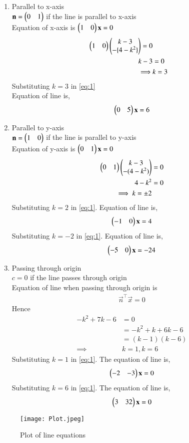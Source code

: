 \documentclass[journal,12pt,twocolumn]{IEEEtran}
\begin{document}
\begin{enumerate}[label=\emph{\alph*)}]
\item Parallel to x-axis\\
$\mathbf{n}=\begin{pmatrix}0 & 1\end{pmatrix}$ if the line is parallel to x-axis\\
Equation of x-axis is $\begin{pmatrix}1 & 0\end{pmatrix}\mathbf{x}=0$\
\begin{equation}
\begin{split}
  \begin{pmatrix}1 & 0\end{pmatrix}\begin{pmatrix}k-3\\-\{4-k^2\}\end{pmatrix} = 0 \label{eq1}\\
  k-3&= 0\\
\implies &k=3
\end{split}
\end{equation}
Substituting $k=3$ in \eqref{eq:1}\\
Equation of line is,
\begin{align}
     \begin{pmatrix}0 & 5\end{pmatrix}\mathbf{x}=6
\end{align}
 
\item Parallel to y-axis\\
$\mathbf{n}=\begin{pmatrix}1 & 0\end{pmatrix}$ if the line is parallel to y-axis\\
Equation of y-axis is $\begin{pmatrix}0 & 1\end{pmatrix}\mathbf{x}=0$
\begin{equation} \label{eq1}
\begin{split}
\begin{pmatrix}0 & 1\end{pmatrix}\begin{pmatrix}k-3\\-(4-k^2)\end{pmatrix} &= 0\\
 4-k^2 & =0\\
 \implies k=\pm2
\end{split}
\end{equation}
Substituting $k=2$ in \eqref{eq:1}.
Equation of line is,
\begin{align}
     \begin{pmatrix}-1 & 0\end{pmatrix}\mathbf{x}= 4
\end{align}
Substituting $k=-2$ in \eqref{eq:1}.
Equation of line is,
\begin{align}
  \begin{pmatrix}-5 & 0\end{pmatrix}\mathbf{x}=-24
\end{align}
\item Passing through origin\\
${c = 0}$ \hspace{4mm}if the line passes through origin\\
Equation of line when passing through origin is 
\begin{align}
\vec{n}^\top\vec{x}=0
\end{align}
Hence
\begin{equation} \label{eq1}
\begin{split}
-k^2+7k-6 & = 0 \\
 & = -k^2+k+6k-6\\
 & = (k-1)(k-6)\\
 \implies&k=1, k=6
\end{split}
\end{equation}
Substituting $k=1$ in \eqref{eq:1}.
The equation of line is,
\begin{align}
\begin{pmatrix}-2&-3\end{pmatrix}\mathbf{x} = 0
\end{align}
Substituting $k=6$ in \eqref{eq:1}.
The equation of line is,
\begin{align}
  \begin{pmatrix}3 & 32\end{pmatrix}\mathbf{x} = 0
\end{align}
\end{enumerate}
\begin{figure}[!h]
         \centering
         \texttt{[image: Plot.jpeg]}
         \caption{Plot of line equations}
         \label{fig:x cubed graph}
\end{figure}
\end{document}
